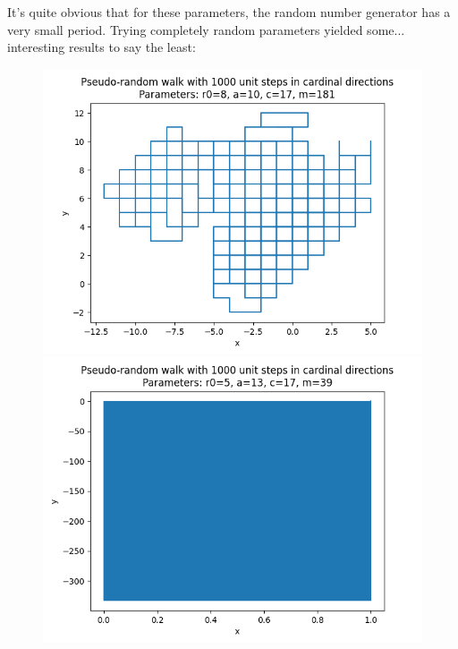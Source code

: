 \documentclass[a4paper,12pt]{article}
\begin{document}
It's quite obvious that for these parameters, the random number generator has a very small period. Trying completely
random parameters yielded some... interesting results to say the least:

\begin{figure}[!ht]
  \centering
  \begin{minipage}{0.48\textwidth}
    \includegraphics[width=\textwidth]{img/2_1b_free_grid.png}
  \end{minipage}
  \begin{minipage}{0.48\textwidth}
    \includegraphics[width=\textwidth]{img/2_1b_free_filled.png}
  \end{minipage}
  \begin{minipage}{0.48\textwidth}

\end{minipage}
\end{figure}
\end{document}
